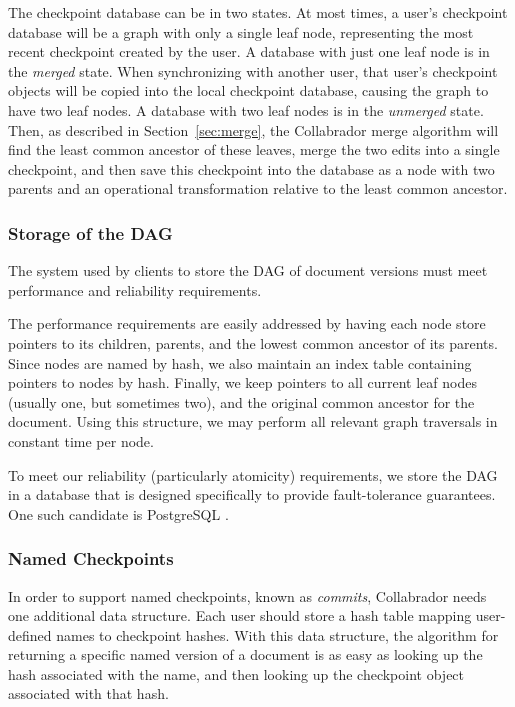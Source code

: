 \documentclass[11pt,titlepage]{article}
\begin{document}
The checkpoint database can be in two states. At most times, a user's 
checkpoint database will be a graph with only a single leaf node, 
representing the most recent checkpoint created by the user. 
A database with just one leaf node is in the \emph{merged}
state. When synchronizing with another user, that user's checkpoint
objects will be copied into the local checkpoint database, causing the
graph to have two leaf nodes. A database with two leaf nodes is in the
\emph{unmerged} state. Then, as described in
Section~\ref{sec:merge}, the Collabrador merge algorithm will find the
least common ancestor of these leaves, merge the two edits into a
single checkpoint, and then save this checkpoint into the database as
a node with two parents and an operational transformation relative to
the least common ancestor.

\subsubsection{Storage of the DAG}
\label{sec:storage-dag}

The system used by clients to store the DAG of document versions must
meet performance and reliability requirements.

The performance requirements are easily addressed by having each node
store pointers to its children, parents, and the lowest common
ancestor of its parents.  Since nodes are named by hash, we also
maintain an index table containing pointers to nodes by hash.
Finally, we keep pointers to all current leaf nodes (usually one, but
sometimes two), and the original common ancestor for the document.
Using this structure, we may perform all relevant graph traversals in
constant time per node.

To meet our reliability (particularly atomicity) requirements, we
store the DAG in a database that is designed specifically to provide
fault-tolerance guarantees.  One such candidate is PostgreSQL
\cite{postgres}.

\subsubsection{Named Checkpoints}

In order to support named checkpoints, known as \emph{commits},
Collabrador needs one additional data structure. Each user should
store a hash table mapping user-defined names to checkpoint hashes. 
With this data structure, the algorithm for returning a specific named
version of a document is as easy as looking up the hash associated with the name,
and then looking up the checkpoint object associated with that hash.
\end{document}
